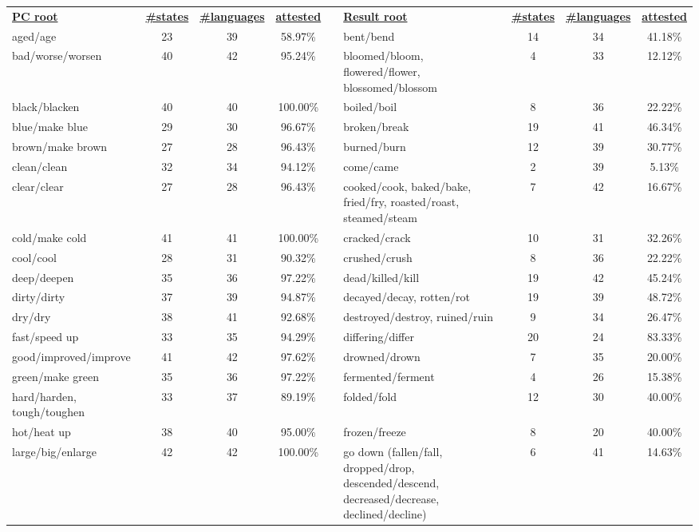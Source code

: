 \begin{tabular}{p{3cm}ccccp{3cm}ccc}
\underline{\textbf{PC root}} & \underline{\textbf{\#states}} & \underline{\textbf{\#languages}} & \underline{\textbf{attested}} & & \underline{\textbf{Result root}} & \underline{\textbf{\#states}} & \underline{\textbf{\#languages}} & \underline{\textbf{attested}} \\
aged/age & 23 & 39 & 58.97\% & & bent/bend & 14 & 34 & 41.18\% \\
bad/worse/worsen & 40 & 42 & 95.24\% & & bloomed/bloom, flowered/flower, blossomed/blossom & 4 & 33 & 12.12\% \\
black/blacken & 40 & 40 & 100.00\% & & boiled/boil & 8 & 36 & 22.22\% \\
blue/make blue & 29 & 30 & 96.67\% & & broken/break & 19 & 41 & 46.34\% \\
brown/make brown & 27 & 28 & 96.43\% & & burned/burn & 12 & 39 & 30.77\% \\
clean/clean & 32 & 34 & 94.12\% & & come/came & 2 & 39 & 5.13\% \\
clear/clear & 27 & 28 & 96.43\% & & cooked/cook, baked/bake, fried/fry, roasted/roast, steamed/steam & 7 & 42 & 16.67\% \\
cold/make cold & 41 & 41 & 100.00\% & & cracked/crack & 10 & 31 & 32.26\% \\
cool/cool & 28 & 31 & 90.32\% & & crushed/crush & 8 & 36 & 22.22\% \\
deep/deepen & 35 & 36 & 97.22\% & & dead/killed/kill & 19 & 42 & 45.24\% \\
dirty/dirty & 37 & 39 & 94.87\% & & decayed/decay, rotten/rot & 19 & 39 & 48.72\% \\
dry/dry & 38 & 41 & 92.68\% & & destroyed/destroy, ruined/ruin & 9 & 34 & 26.47\% \\
fast/speed up & 33 & 35 & 94.29\% & & differing/differ & 20 & 24 & 83.33\% \\
good/improved/improve & 41 & 42 & 97.62\% & & drowned/drown & 7 & 35 & 20.00\% \\
green/make green & 35 & 36 & 97.22\% & & fermented/ferment & 4 & 26 & 15.38\% \\
hard/harden, tough/toughen & 33 & 37 & 89.19\% & & folded/fold & 12 & 30 & 40.00\% \\
hot/heat up & 38 & 40 & 95.00\% & & frozen/freeze & 8 & 20 & 40.00\% \\
large/big/enlarge & 42 & 42 & 100.00\% & & go down (fallen/fall, dropped/drop, descended/descend, decreased/decrease, declined/decline) & 6 & 41 & 14.63\% \\

\end{tabular}
